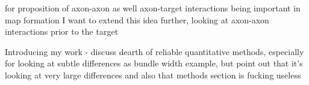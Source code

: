 
\cite{weth2014chemoaffinity} for proposition of axon-axon as well axon-target interactions being important in map formation
I want to extend this idea further, looking at axon-axon interactions prior to the target

Introducing my work - discuss dearth of reliable quantitative methods, especially for looking at subtle differences
\cite{jaworski2012autocrine} as bundle width example, but point out that it's looking at very large differences and also that methods section is fucking useless